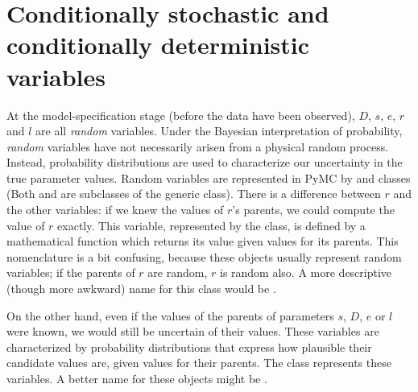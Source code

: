 \section*{Conditionally stochastic and conditionally deterministic variables}

At the model-specification stage (before the data have been observed), $D$, $s$, $e$, $r$ and $l$ are all \emph{random} variables. Under the Bayesian interpretation of probability, \emph{random} variables have not necessarily arisen from a physical random process. Instead, probability distributions are used to characterize our uncertainty in the true parameter values. Random variables are represented in PyMC by  and  classes (Both  and  are subclasses of the generic  class). There is a difference between $r$ and the other variables: if we knew the values of $r$'s parents, we could compute the value of $r$ exactly. This variable, represented by the  class, is defined by a mathematical function which returns its value given values for its parents. This nomenclature is a bit confusing, because these objects usually represent random variables; if the parents of $r$ are random, $r$ is random also. A more descriptive (though more awkward) name for this class would be .

On the other hand, even if the values of the parents of parameters $s$, $D$, $e$ or $l$ were known, we would still be uncertain of their values. These variables are characterized by probability distributions that express how plausible their candidate values are, given values for their parents. The  class represents these variables. A better name for these objects might be .

